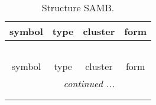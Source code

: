 \documentclass[fleqn,10pt,landscape]{article}
\begin{document}
\begin{itemize}
\begin{center}
\begin{longtable}{c|c|c|c}
\end{longtable}
\end{center}
\begin{center}
\renewcommand{\arraystretch}{1.3}
\begin{longtable}{c|c|c|c}
\caption{Structure SAMB.}
 \\
 \hline \hline
symbol & type & cluster & form \\ \hline \endfirsthead

\multicolumn{3}{l}{\tablename\ \thetable{}} \\
 \hline \hline
symbol & type & cluster & form \\ \hline \endhead

 \hline \hline
\multicolumn{3}{r}{\footnotesize\it continued ...} \\ \endfoot

 \hline \hline
\multicolumn{3}{r}{} \\ \endlastfoot


\end{longtable}
\end{center}
\end{itemize}
\end{document}

